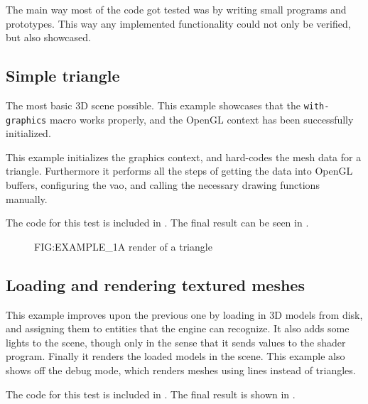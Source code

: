 
\label{SEC:EXAMPLES}


The main way most of the code got tested was by writing small programs and prototypes.
This way any implemented functionality could not only be verified,
but also showcased.

\subsection{Simple triangle}

The most basic 3D scene possible.
This example showcases that the \texttt{with-graphics} macro works properly,
and the OpenGL context has been successfully initialized.

This example initializes the graphics context,
and hard-codes the mesh data for a triangle.
Furthermore it performs all the steps of getting the data into OpenGL buffers,
configuring the \ac{vao},
and calling the necessary drawing functions manually.

The code for this test is included in .
The final result can be seen in .

\begin{figure}[Exploratory tests \textemdash\, Triangle]{FIG:EXAMPLE_1}{A render of a triangle}
\end{figure}

\subsection{Loading and rendering textured meshes}

This example improves upon the previous one by loading in 3D models from disk,
and assigning them to entities that the engine can recognize.
It also adds some lights to the scene,
though only in the sense that it sends values to the shader program.
Finally it renders the loaded models in the scene.
This example also shows off the debug mode,
which renders meshes using lines instead of triangles.

The code for this test is included in .
The final result is shown in .

